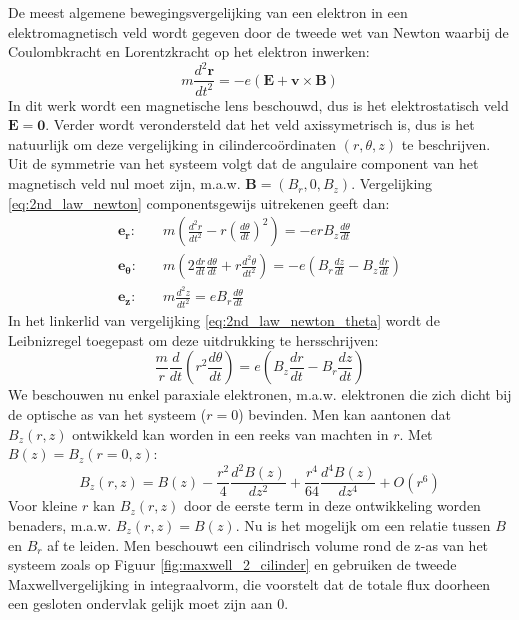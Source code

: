 \documentclass[we,twoside,openright,a4paper,11pt]{uantwerpenbamathesis}
\begin{document}
De meest algemene bewegingsvergelijking van een elektron in een elektromagnetisch veld wordt gegeven door de tweede wet van Newton waarbij de Coulombkracht en Lorentzkracht op het elektron inwerken:
\begin{equation}\label{eq:2nd_law_newton}
    m\frac{d^2\mathbf{r}}{dt^2}=-e(\mathbf{E}+\mathbf{v}\times\mathbf{B})
\end{equation}
In dit werk wordt een magnetische lens beschouwd, dus is het elektrostatisch veld $\mathbf{E}=\mathbf{0}$. Verder wordt verondersteld dat het veld axissymetrisch is, dus is het natuurlijk om deze vergelijking in cilindercoördinaten $(r, \theta, z)$ te beschrijven. Uit de symmetrie van het systeem volgt dat de angulaire component van het magnetisch veld nul moet zijn, m.a.w. $\mathbf{B}=(B_r, 0, B_z)$. Vergelijking \ref{eq:2nd_law_newton} componentsgewijs uitrekenen geeft dan:
\begin{align}
    \mathbf{e_r}: \quad & m\left(\frac{d^2r}{dt^2}-r\left(\frac{d\theta}{dt}\right)^2\right) = -erB_z\frac{d\theta}{dt} \label{eq:2nd_law_newton_r} \\[6pt]
    \mathbf{e_\theta}: \quad & m\left(2\frac{dr}{dt}\frac{d\theta}{dt}+r\frac{d^2\theta}{dt^2}\right) = -e\left(B_r\frac{dz}{dt}-B_z\frac{dr}{dt}\right) \label{eq:2nd_law_newton_theta} \\[6pt]
    \mathbf{e_z}: \quad & m\frac{d^2z}{dt^2} = eB_r\frac{d\theta}{dt} \label{eq:2nd_law_newton_z}
\end{align}
In het linkerlid van vergelijking \ref{eq:2nd_law_newton_theta} wordt de Leibnizregel toegepast om deze uitdrukking te hersschrijven:
\begin{equation}\label{eq:theta_tussenstap}
    \frac{m}{r}\frac{d}{dt}\left(r^2\frac{d\theta}{dt}\right)=e\left(B_z\frac{dr}{dt}-B_r\frac{dz}{dt}\right)
\end{equation}
We beschouwen nu enkel paraxiale elektronen, m.a.w. elektronen die zich dicht bij de optische as van het systeem ($r=0$) bevinden. Men kan aantonen dat $B_z(r, z)$ ontwikkeld kan worden in een reeks van machten in $r$. Met $B(z)=B_z(r=0, z)$:
\begin{equation}\label{eq:b_z_expansion}
    B_z(r, z)=B(z)-\frac{r^2}{4}\frac{d^2B(z)}{dz^2}+\frac{r^4}{64}\frac{d^4B(z)}{dz^4}+O(r^6)
\end{equation}
Voor kleine $r$ kan $B_z(r, z)$ door de eerste term in deze ontwikkeling worden benaders, m.a.w. $B_z(r, z)=B(z)$. Nu is het mogelijk om een relatie tussen $B$ en $B_r$ af te leiden. Men beschouwt een cilindrisch volume rond de z-as van het systeem zoals op Figuur \ref{fig:maxwell_2_cilinder} en gebruiken de tweede Maxwellvergelijking in integraalvorm, die voorstelt dat de totale flux doorheen een gesloten ondervlak gelijk moet zijn aan $0$.
\end{document}
